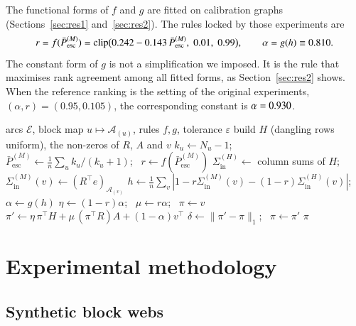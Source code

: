 \documentclass[11pt,a4paper]{article}
\theoremstyle{definition}
\theoremstyle{remark}
\newcommand{\Pbar}{\bar P^{(M)}_{\mathrm{esc}}}
\newcommand{\Sin}{\Sigma_{\mathrm{in}}}
\newcommand{\clip}{\mathrm{clip}}
\begin{document}
The functional forms of $f$ and $g$ are fitted on calibration graphs (Sections~\ref{sec:res1}
and~\ref{sec:res2}). The rules locked by those experiments are
\begin{equation}
r=f(\Pbar)=\clip\bigl(0.242-0.143\,\Pbar,\;0.01,\;0.99\bigr),\qquad \alpha=g(h)\equiv\STwoConstAlpha .
\label{eq:locked}
\end{equation}
The constant form of $g$ is not a simplification we imposed. It is the rule that maximises rank
agreement among all fitted forms, as Section~\ref{sec:res2} shows. When the reference ranking is the
setting of the original experiments, $(\alpha,r)=(0.95,0.105)$, the corresponding constant is
$\alpha=0.930$.

\begin{algorithm}[t]
\caption{Two-stage calibrated NCDawareRank}
\label{alg:twostage}
\begin{algorithmic}[1]
\Require arcs $\mathcal E$, block map $u\mapsto\mathcal A_{(u)}$, rules $f,g$, tolerance $\varepsilon$
\State build $H$ (dangling rows uniform), the non-zeros of $R$, $A$ and $v$ 
\State $k_u\gets N_u-1$; \ $\Pbar\gets\frac1n\sum_u k_u/(k_u+1)$; \ $r\gets f(\Pbar)$ 
\State $\Sin^{(H)}\gets$ column sums of $H$; \ $\Sin^{(M)}(v)\gets(R^\top e)_{\mathcal A_{(v)}}$
\State $h\gets\frac1n\sum_v|1-r\Sin^{(M)}(v)-(1-r)\Sin^{(H)}(v)|$; \ $\alpha\gets g(h)$ 
\State $\eta\gets(1-r)\alpha$; \ $\mu\gets r\alpha$; \ $\pi\gets v$
\Repeat
  \State $\pi'\gets\eta\,\pi^\top H+\mu\,(\pi^\top R)A+(1-\alpha)v^\top$ 
  \State $\delta\gets\|\pi'-\pi\|_1$; \ $\pi\gets\pi'$
\Until{$\delta<\varepsilon$}
\State \Return $\pi$
\end{algorithmic}
\end{algorithm}

\section{Experimental methodology}
\label{sec:method}

\subsection{Synthetic block webs}
\end{document}
